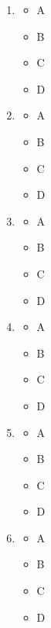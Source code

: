 \documentclass[11pt]{article}
\begin{document}
\begin{enumerate}
\begin{multicols}{4}
\begin{itemize}[label=$\Box$]
    \end{itemize}
    \end{multicols}
  \item \begin{multicols}{4}
    \begin{itemize}[label=$\Box$]
      \item A
      \item B
      \item C
      \item D
    \end{itemize}
    \end{multicols}
  \item \begin{multicols}{4}
    \begin{itemize}[label=$\Box$]
      \item A
      \item B
      \item C
      \item D
    \end{itemize}
    \end{multicols}
  \item \begin{multicols}{4}
    \begin{itemize}[label=$\Box$]
      \item A
      \item B
      \item C
      \item D
    \end{itemize}
    \end{multicols}
  \item \begin{multicols}{4}
    \begin{itemize}[label=$\Box$]
      \item A
      \item B
      \item C
      \item D
    \end{itemize}
    \end{multicols}
  \item \begin{multicols}{4}
    \begin{itemize}[label=$\Box$]
      \item A
      \item B
      \item C
      \item D
    \end{itemize}
    \end{multicols}
  \item \begin{multicols}{4}
    \begin{itemize}[label=$\Box$]
      \item A
      \item B
      \item C
      \item D
    \end{itemize}
    \end{multicols}
\end{enumerate}
\end{document}
